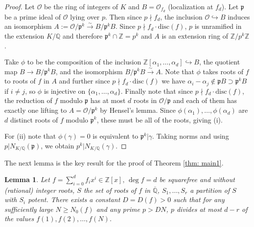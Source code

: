 \documentclass[alphabetic]{amsart}
\newtheorem{lem}[claim]{Lemma}
\theoremstyle{definition}
\numberwithin{equation}{section}
\newcommand{\Z}{{\mathbb Z}}
\newcommand{\Q}{{\mathbb Q}}
\newcommand{\Qb}{{\overline{\Q}}}
\newcommand{\disc}{{\mathrm{disc}}}
\newcommand{\isom}{{\xrightarrow{\sim}}}
\numberwithin{equation}{section}
\begin{document}
\begin{proof} Let $\mathcal O$ be the ring of integers of $K$ and $B=\mathcal O_{f_d}$ (localization at $f_d$). Let $\mathfrak p$ be a prime ideal of $\mathcal O$ lying over $p$. Then since $p\nmid f_d$, the inclusion $\mathcal O\hookrightarrow B$ induces an isomorphism $A:=\mathcal O/\mathfrak p^k\isom B/\mathfrak p^kB$. Since $p\nmid f_d\cdot\disc(f)$, $p$ is unramified in the extension $K/\Q$ and therefore $\mathfrak p^k\cap\Z=p^k$ and $A$ is an extension ring of $\Z/p^k\Z$.

Take $\phi$ to be the composition of the inclusion $\Z[\alpha_1,\ldots,\alpha_d]\hookrightarrow B$, the quotient map $B\to B/\mathfrak p^kB$, and the isomorphism $B/\mathfrak p^kB\isom A$. Note that $\phi$ takes roots of $f$ to roots of $f$ in $A$ and further since $p\nmid f_d\cdot\disc(f)$ we have $\alpha_i-\alpha_j\not\in\mathfrak p B\supset\mathfrak p^kB$ if $i\neq j$, so $\phi$ is injective on $\{\alpha_1,\ldots,\alpha_d\}$. Finally note that since $p\nmid f_d\cdot\disc(f)$, the reduction of $f$ modulo $\mathfrak p$ has at most $d$ roots in $\mathcal O/\mathfrak p$ and each of them has exactly one lifting to $A=\mathcal O/\mathfrak p^k$ by Hensel's lemma. Since $\phi(\alpha_1),\ldots,\phi(\alpha_d)$ are $d$ distinct roots of $f$ modulo $\mathfrak p^k$, these must be all of the roots, giving (i).

For (ii) note that $\phi(\gamma)=0$ is equivalent to $\mathfrak p^k|\gamma$. Taking norms and using $p|N_{K/\Q}(\mathfrak p)$, we obtain $p^k|N_{K/\Q}(\gamma)$.

\end{proof}

The next lemma is the key result for the proof of Theorem \ref{thm: main1}.

\begin{lem}\label{lem: main1} Let $f=\sum_{i=0}^df_ix^i\in\Z[x],\,\deg f=d$ be squarefree and without (rational) integer roots, $S$ the set of roots of $f$ in $\Qb$, $S_1,\ldots,S_r$ a partition of $S$ with $S_i$ potent. There exists a constant $D=D(f)>0$ such that for any sufficiently large $N\ge N_0(f)$ and any prime $p>DN$, $p$ divides at most $d-r$ of the values $f(1),f(2),\ldots,f(N)$.
\end{lem}
\end{document}
